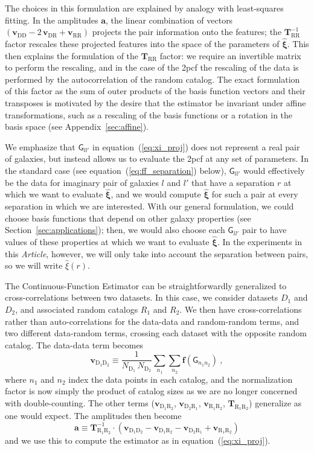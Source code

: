 \documentclass[modern]{aastex62}
\newcommand{\cf}{2pcf\xspace}
\newcommand{\Est}{The Continuous-Function Estimator\xspace}
\newcommand{\documentname}{\textsl{Article}\xspace}
\newcommand{\eqt}[1]{equation~(\ref{#1})}
\newcommand{\inv}{^{-1}}
\newcommand{\bld}[1]{\bm{#1}}
\newcommand{\vv}[1]{\bld{v}_\mathrm{#1}}
\newcommand{\TT}[1]{\bld{T}_\mathrm{#1}}
\newcommand{\ff}{\bld{f}}
\newcommand{\NN}[1]{N_\mathrm{#1}}
\newcommand{\GG}[1]{\mathsf{G}_{#1}}
\begin{document}
The choices in this formulation are explained by analogy with least-squares fitting.
In the amplitudes $\bld{a}$, the linear combination of vectors $(\vv{DD} - 2\,\vv{DR} + \vv{RR})$ projects the pair information onto the features; the $\TT{RR}\inv$ factor rescales these projected features into the space of the parameters of $\bld{\hat{\xi}}$.
This then explains the formulation of the $\TT{RR}$ factor: we require an invertible matrix to perform the rescaling, and in the case of the \cf the rescaling of the data is performed by the autocorrelation of the random catalog.
The exact formulation of this factor as the sum of outer products of the basis function vectors and their transposes is motivated by the desire that the estimator be invariant under affine transformations, such as a rescaling of the basis functions or a rotation in the basis space (see Appendix~\ref{sec:affine}).

We emphasize that $\GG{ll'}$ in \eqt{eq:xi_proj} does not represent a real pair of galaxies, but instead allows us to evaluate the \cf at any set of parameters.
In the standard case (see \eqt{eq:ff_separation} below), $\GG{ll'}$ would effectively be the data for imaginary pair of galaxies $l$ and $l'$ that have a separation $r$ at which we want to evaluate $\bld{\hat{\xi}}$, and we would compute $\bld{\hat{\xi}}$ for such a pair at every separation in which we are interested.
With our general formulation, we could choose basis functions that depend on other galaxy properties (see Section~\ref{sec:applications}); then, we would also choose each $\GG{ll'}$ pair to have values of these properties at which we want to evaluate $\bld{\hat{\xi}}$.
In the experiments in this \documentname, however, we will only take into account the separation between pairs, so we will write $\hat{\xi}(r)$.

\Est can be straightforwardly generalized to cross-correlations between two datasets.
In this case, we consider datasets $D_1$ and $D_2$, and associated random catalogs $R_1$ and $R_2$. 
We then have cross-correlations rather than auto-correlations for the data-data and random-random terms, and two different data-random terms, crossing each dataset with the opposite random catalog. 
The data-data term becomes 
\begin{equation}
    \vv{D_1 D_2} \equiv \frac{1}{\NN{D_1}\,\NN{D_2}} \sum_{n_1} \sum_{n_2} \ff(\GG{n_1 n_2}) ~,
\end{equation}
where $n_1$ and $n_2$ index the data points in each catalog, and the normalization factor is now simply the product of catalog sizes as we are no longer concerned with double-counting.
The other terms ($\vv{D_1 R_2}$, $\vv{D_2 R_1}$, $\vv{R_1 R_2}$, $\TT{R_1 R_2}$) generalize as one would expect.
The amplitudes then become
\begin{equation}\displaystyle
    \bld{a} \equiv \TT{R_1 R_2}\inv \cdot (\vv{D_1 D_2} - \vv{D_1 R_2} - \vv{D_2 R_1} + \vv{R_1 R_2})
 \end{equation}
and we use this to compute the estimator as in \eqt{eq:xi_proj}.
\end{document}
